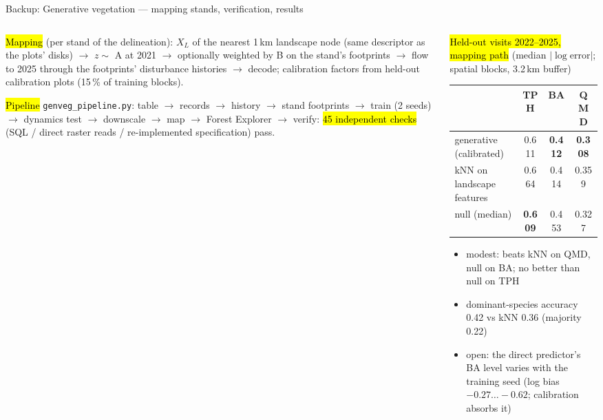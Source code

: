 \begin{frame}{Backup: Generative vegetation — mapping stands, verification, results}
\footnotesize
\begin{columns}[T]
\begin{column}{0.46\textwidth}
\hl{Mapping} (per stand of the delineation): $X_L$ of the nearest 1\,km landscape node (same descriptor as the plots' disks) $\rightarrow$ $z\sim$ A at 2021 $\rightarrow$ optionally weighted by B on the stand's footprints $\rightarrow$ flow to 2025 through the footprints' disturbance histories $\rightarrow$ decode; calibration factors from held-out calibration plots (15\,\% of training blocks).

\medskip
\hl{Pipeline} \texttt{genveg\_pipeline.py}: table $\rightarrow$ records $\rightarrow$ history $\rightarrow$ stand footprints $\rightarrow$ train (2 seeds) $\rightarrow$ dynamics test $\rightarrow$ downscale $\rightarrow$ map $\rightarrow$ Forest Explorer $\rightarrow$ verify: \hl{45 independent checks} (SQL / direct raster reads / re-implemented specification) pass.
\end{column}
\begin{column}{0.52\textwidth}
\hl{Held-out visits 2022–2025, mapping path} (median $|\log\text{error}|$; spatial blocks, 3.2\,km buffer)

\smallskip
\renewcommand{\arraystretch}{1.05}
\begin{tabular}{@{}lccc@{}}
\toprule
 & TPH & BA & QMD\\
\midrule
generative (calibrated) & 0.611 & \textbf{0.412} & \textbf{0.308}\\
kNN on landscape features & 0.664 & 0.414 & 0.359\\
null (median) & \textbf{0.609} & 0.453 & 0.327\\
\bottomrule
\end{tabular}

\medskip
\begin{itemize}\setlength\itemsep{1pt}
\item modest: beats kNN on QMD, null on BA; no better than null on TPH
\item dominant-species accuracy 0.42 vs kNN 0.36 (majority 0.22)
\item open: the direct predictor's BA level varies with the training seed (log bias $-0.27\ldots-0.62$; calibration absorbs it)
\end{itemize}
\end{column}
\end{columns}
\end{frame}


